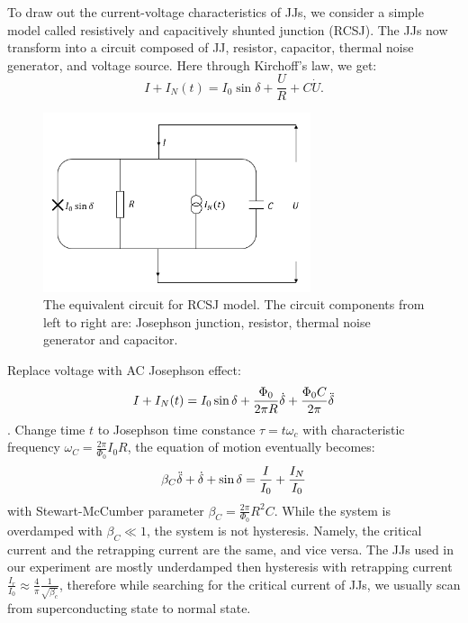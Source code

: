 To draw out the current-voltage characteristics of JJs, we consider a simple model called resistively and capacitively shunted junction (RCSJ)\cite{RN35}. The JJs now transform into a circuit composed of JJ, resistor, capacitor, thermal noise generator, and voltage source. Here through Kirchoff's law, we get:
\begin{equation}
    I + I_N(t) = I_0 \sin{\delta} + \frac{U}{R} + C\dot{U}.
\end{equation}
\begin{figure}[h!]
    \centering
    \includegraphics[width=0.7\textwidth]{Pic/RSCJ_circuit.png}
    \caption{The equivalent circuit for RCSJ model. The circuit components from left to right are: Josephson junction, resistor, thermal noise generator and capacitor.}
    \label{fig:my_label}
\end{figure}
Replace voltage with AC Josephson effect:
\begin{equation}
    I + I_N(t) = I_0 \sin{\delta} + \frac{\Phi_0}{2\pi R}\dot{\delta} + \frac{\Phi_0 C}{2\pi}\Ddot{\delta} 
\end{equation}. 
Change time $t$ to Josephson time constance $\tau = t\omega_c$ with characteristic frequency $\omega_C = \frac{2\pi}{\Phi_0}I_0 R$, the equation of motion eventually becomes:
\begin{equation}
    \beta_C \Ddot{\delta} + \dot{\delta} + \sin{\delta} = \frac{I}{I_0} + \frac{I_N}{I_0}
\end{equation}
with Stewart-McCumber parameter $\beta_C = \frac{2\pi}{\Phi_0}R^2 C$. While the system is overdamped with $\beta_C \ll 1$, the system is not hysteresis. Namely, the critical current and the retrapping current are the same, and vice versa. The JJs used in our experiment are mostly underdamped then hysteresis with retrapping current $\frac{I_r}{I_0} \approx\frac{4}{\pi}\frac{1}{\sqrt{\beta_c}}$, therefore while searching for the critical current of JJs, we usually scan from superconducting state to normal state.


